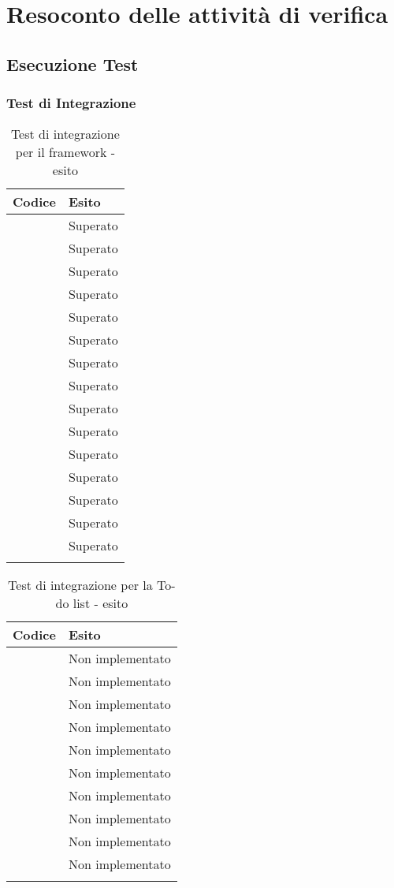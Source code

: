 \section{Resoconto delle attività di verifica}\label{app:resoconto_verifica}

\subsection{Esecuzione Test}
\subsubsection{Test di Integrazione}
\begin{longtable}{|c|c|}
	\hline \multicolumn{1}{|l|}{\textbf{Codice}} & \multicolumn{1}{l|}{\textbf{Esito}}
	\\
	\hline \testt{} & Superato\\
	\hline \testt{} & Superato\\
	\hline \testt{} & Superato\\
	\hline \testt{} & Superato\\
	\hline \testt{} & Superato\\
	\hline \testt{} & Superato\\
	\hline \testt{} & Superato\\
	\hline \testt{} & Superato\\
	\hline \testt{} & Superato\\
	\hline \testt{} & Superato\\
	\hline \testt{} & Superato\\
	\hline \testt{} & Superato\\
	\hline \testt{} & Superato\\
	\hline \testt{} & Superato\\
	\hline \testt{} & Superato\\
	\hline
	\caption{Test di integrazione per il framework - esito}
\end{longtable}
\begin{longtable}{|c|c|}
	\hline \multicolumn{1}{|l|}{\textbf{Codice}} & \multicolumn{1}{l|}{\textbf{Esito}}
	\\
	\hline \testt{} & Non implementato\\
	\hline \testt{} & Non implementato\\
	\hline \testt{} & Non implementato\\
	\hline \testt{} & Non implementato\\
	\hline \testt{} & Non implementato\\
	\hline \testt{} & Non implementato\\
	\hline \testt{} & Non implementato\\
	\hline \testt{} & Non implementato\\
	\hline \testt{} & Non implementato\\
	\hline \testt{} & Non implementato\\
	\hline
	\caption{Test di integrazione per la To-do list - esito}
\end{longtable}
